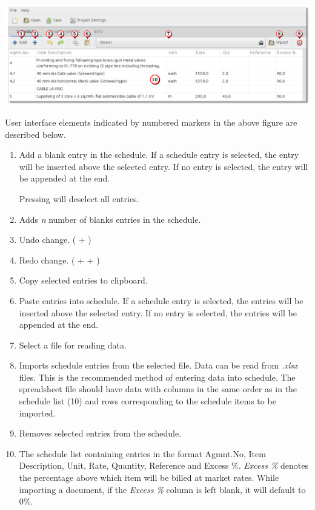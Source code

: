 \documentclass[twoside,a4paper]{refart}
\newenvironment{noteblock}[1]%
{\begin{mdframed}[topline=false,bottomline=false, rightline=false,
		linewidth=2pt, frametitle={#1}]}%
		{\end{mdframed}}
\begin{document}
	 \begin{maxipage}
	 	\includegraphics[width=1\linewidth]{screenshots/window_sch.png}
	 \end{maxipage}
	 
	 User interface elements indicated by numbered markers in the above figure are described below.
	 
	 \begin{enumerate}
	 	\item Add a blank entry in the schedule. If a schedule entry is selected, the entry will be inserted above the selected entry. If no entry is selected, the entry will be appended at the end.\\
	 	\begin{noteblock}{Tips!}
	 		Pressing  will deselect all entries.
	 	\end{noteblock}
	 	\item Adds \emph{n} number of blanks entries in the schedule.
	 	\item Undo change. ( + )
	 	\item Redo change. ( +  + )	 
	 	\item Copy selected entries to clipboard.
	 	\item Paste entries into schedule. If a schedule entry is selected, the entries will be inserted above the selected entry. If no entry is selected, the entries will be appended at the end.
	 	\item Select a file for reading data.
	 	\item \attention Imports schedule entries from the selected file. Data can be read from \emph{.xlsx} files. This is the recommended method of entering data into schedule. The spreadsheet file should have data with columns in the same order as in the schedule list (10) and rows corresponding to the schedule items to be imported.
	 	\item Removes selected entries from the schedule.
	 	\item The schedule list containing entries in the format Agmnt.No, Item Description, Unit, Rate, Quantity, Reference and Excess \%. \emph{Excess \%} denotes the percentage above which item will be billed at market rates. \attention While importing a document, if the \emph{Excess \%} column is left blank, it will default to 0\%.
	 \end{enumerate}
	 
\end{document}
